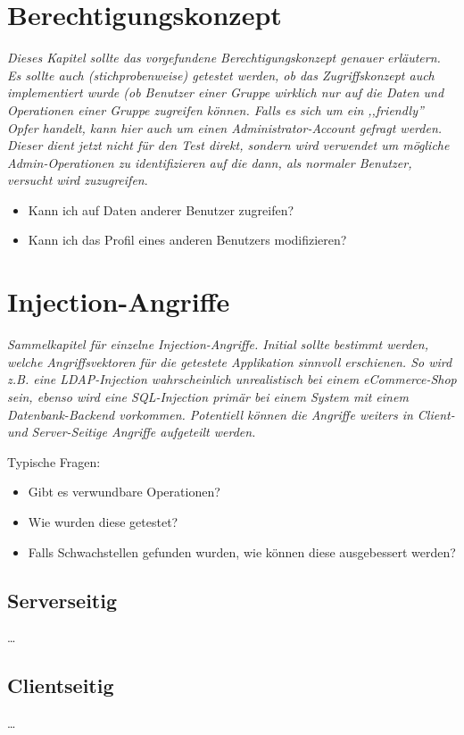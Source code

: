 \section{Berechtigungskonzept}

\textit{Dieses Kapitel sollte das vorgefundene Berechtigungskonzept genauer erläutern. Es sollte auch (stichprobenweise) getestet werden, ob das Zugriffskonzept auch implementiert wurde (ob Benutzer einer Gruppe wirklich nur auf die Daten und Operationen einer Gruppe zugreifen können. Falls es sich um ein ,,friendly'' Opfer handelt, kann hier auch um einen Administrator-Account gefragt werden. Dieser dient jetzt nicht für den Test direkt, sondern wird verwendet um mögliche Admin-Operationen zu identifizieren auf die dann, als normaler Benutzer, versucht wird zuzugreifen}.

\begin{itemize}
				\item Kann ich auf Daten anderer Benutzer zugreifen?
				\item Kann ich das Profil eines anderen Benutzers modifizieren?
\end{itemize}

\section{Injection-Angriffe}

\textit{Sammelkapitel für einzelne Injection-Angriffe. Initial sollte bestimmt werden, welche Angriffsvektoren für die getestete Applikation sinnvoll erschienen. So wird z.B. eine LDAP-Injection wahrscheinlich unrealistisch bei einem eCommerce-Shop sein, ebenso wird eine SQL-Injection primär bei einem System mit einem Datenbank-Backend vorkommen. Potentiell können die Angriffe weiters in Client- und Server-Seitige Angriffe aufgeteilt werden.}

Typische Fragen:

\begin{itemize}
	\item Gibt es verwundbare Operationen?
	\item Wie wurden diese getestet?
	\item Falls Schwachstellen gefunden wurden, wie können diese ausgebessert werden?
\end{itemize}

\subsection{Serverseitig}

\ldots

\subsection{Clientseitig}

\ldots
